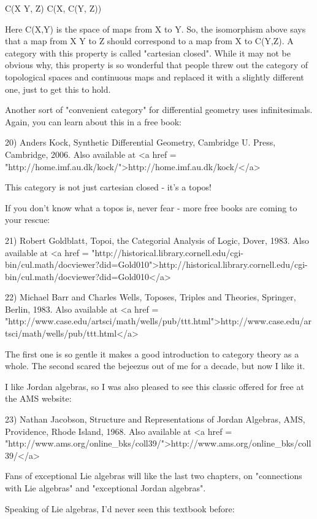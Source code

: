 C(X \times  Y, Z) \cong  C(X, C(Y, Z))

Here C(X,Y) is the space of maps from X to Y.  So, the isomorphism
above says that a map from X \times  Y to Z should correspond to a map
from X to C(Y,Z).  A category with this property is called
"cartesian closed".  While it may not be obvious why,
this property is so wonderful that people threw out the
category of topological spaces and continuous maps and replaced it
with a slightly different one, just to get this to hold.

Another sort of "convenient category" for differential
geometry uses infinitesimals.  Again, you can learn about this in a
free book:

20) Anders Kock, Synthetic Differential Geometry, Cambridge U. Press,
Cambridge, 2006.  Also available at <a href = "http://home.imf.au.dk/kock/">http://home.imf.au.dk/kock/</a>

This category is not just cartesian closed - it's a topos!

If you don't know what a topos is, never fear - more free books are
coming to your rescue:

21) Robert Goldblatt, Topoi, the Categorial Analysis of Logic, 
Dover, 1983.  Also available at 
<a href = "http://historical.library.cornell.edu/cgi-bin/cul.math/docviewer?did=Gold010">http://historical.library.cornell.edu/cgi-bin/cul.math/docviewer?did=Gold010</a>

22) Michael Barr and Charles Wells, Toposes, Triples and Theories,
Springer, Berlin, 1983.   Also available at
<a href = "http://www.case.edu/artsci/math/wells/pub/ttt.html">http://www.case.edu/artsci/math/wells/pub/ttt.html</a>

The first one is so gentle it makes a good introduction to category 
theory as a whole.  The second scared the bejeezus out of me for a 
decade, but now I like it.

I like Jordan algebras, so I was also pleased to see this classic
offered for free at the AMS website:

23) Nathan Jacobson, Structure and Representations of Jordan Algebras,
AMS, Providence, Rhode Island, 1968.  Also available at 
<a href = "http://www.ams.org/online_bks/coll39/">http://www.ams.org/online_bks/coll39/</a>

Fans of exceptional Lie algebras will like the last two chapters, on
"connections with Lie algebras" and "exceptional Jordan algebras".

Speaking of Lie algebras, I'd never seen this textbook before:

